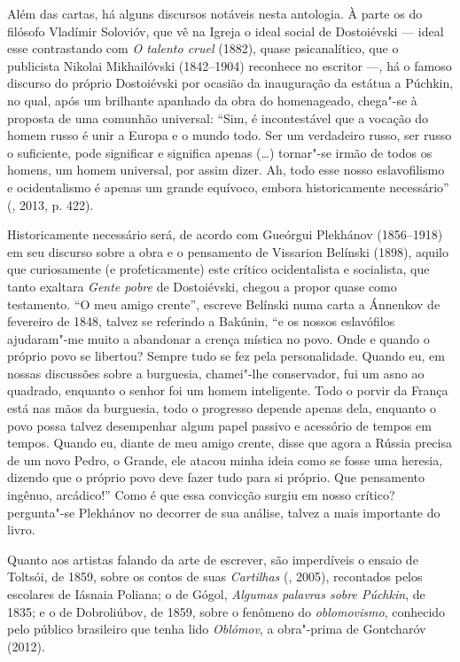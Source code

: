 Além das cartas, há alguns discursos notáveis nesta antologia. À parte
os do filósofo Vladímir Solovióv, que vê na Igreja o ideal social de
Dostoiévski --- ideal esse contrastando com \emph{O talento
cruel} (1882), quase psicanalítico, que o publicista Nikolai Mikhailóvski (1842--1904) reconhece
no escritor ---, há o famoso discurso do próprio Dostoiévski por ocasião da
inauguração da estátua a Púchkin, no qual, após um brilhante
apanhado da obra do homenageado, chega"-se à proposta de uma comunhão
universal: ``Sim, é incontestável que a vocação do homem russo é unir a
Europa e o mundo todo. Ser um verdadeiro russo, ser russo o suficiente,
pode significar e significa apenas (\ldots{}) tornar"-se irmão de todos os
homens, um homem universal, por assim dizer. Ah, todo esse nosso
eslavofilismo e ocidentalismo é apenas um grande equívoco, embora
historicamente necessário'' (, 2013, p. 422).

Historicamente necessário será, de acordo com Gueórgui Plekhánov (1856--1918) em seu
discurso sobre a obra e o pensamento de Vissarion Belínski (1898), 
aquilo que curiosamente (e profeticamente) este crítico ocidentalista e socialista, que tanto
exaltara \emph{Gente pobre} de Dostoiévski, chegou a propor quase como
testamento. ``O meu amigo crente'', escreve Belínski numa carta a
Ánnenkov de fevereiro de 1848, talvez se referindo a Bakúnin, ``e os
nossos eslavófilos ajudaram"-me muito a abandonar a crença mística no
povo. Onde e quando o próprio povo se libertou? Sempre tudo se fez pela
personalidade. Quando eu, em nossas discussões sobre a burguesia,
chamei"-lhe conservador, fui um asno ao quadrado, enquanto o senhor foi
um homem inteligente. Todo o porvir da França está nas mãos da
burguesia, todo o progresso depende apenas dela, enquanto o povo possa
talvez desempenhar algum papel passivo e acessório de tempos em tempos.
Quando eu, diante de meu amigo crente, disse que agora a Rússia precisa
de um novo Pedro, o Grande, ele atacou minha ideia como se fosse uma
heresia, dizendo que o próprio povo deve fazer tudo para si próprio. Que
pensamento ingênuo, arcádico!'' Como é que essa convicção surgiu em
nosso crítico? pergunta"-se Plekhánov no decorrer de sua
análise, talvez a mais importante do livro.

Quanto aos artistas falando da arte de escrever, são imperdíveis o
ensaio de Toltsói, de 1859, sobre os contos de suas \emph{Cartilhas} (, 2005), recontados pelos escolares de Iásnaia Poliana; o de Gógol, \emph{Algumas palavras sobre Púchkin}, de 1835; e o de Dobroliúbov,
de 1859, sobre o fenômeno do \emph{oblomovismo}, conhecido pelo público
brasileiro que tenha lido \emph{Oblómov}, a obra"-prima de Gontcharóv
(2012).

